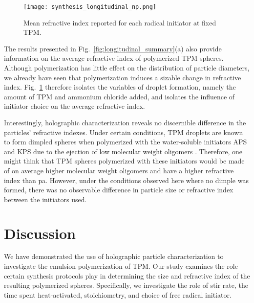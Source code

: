 \begin{figure}
    \centering
    \texttt{[image: synthesis\_longitudinal\_np.png]}
    \caption{Mean refractive index reported for each radical initiator
    at fixed TPM.}
    \label{fig:longitudinal_np}
\end{figure}

The results presented in Fig.~\ref{fig:longitudinal_summary}(a) also provide information
on the average refractive index of polymerized TPM spheres. Although polymerization
has little effect on the distribution of particle diameters, we already have seen that
polymerization induces a sizable change in refractive index. Fig.~\ref{fig:longitudinal_np} therefore isolates the
variables of droplet formation, namely the amount of TPM and ammonium chloride added,
and isolates the influence of initiator choice on the average refractive index.


Interestingly, holographic characterization reveals no discernible difference
in the particles' refractive indexes.
Under certain conditions, TPM droplets are known to form dimpled spheres when polymerized
with the water-soluble initiators APS and KPS due to the ejection of low molecular weight
oligomers \cite{sacanna11}.
Therefore, one might think that TPM spheres polymerized with these initiators would be
made of on average higher molecular weight oligomers and have a higher refractive index
than pa. However, under the conditions observed here where no dimple was formed, there
was no observable difference in particle size or refractive index between the initiators
used.

\section{Discussion}

We have demonstrated the use of holographic particle characterization
to investigate the emulsion polymerization of TPM. Our study examines the
role certain synthesis protocols play in determining the
size and refractive index of the resulting polymerized spheres. Specifically,
we investigate the role of stir rate, the time spent heat-activated, stoichiometry, and choice of
free radical initiator.

